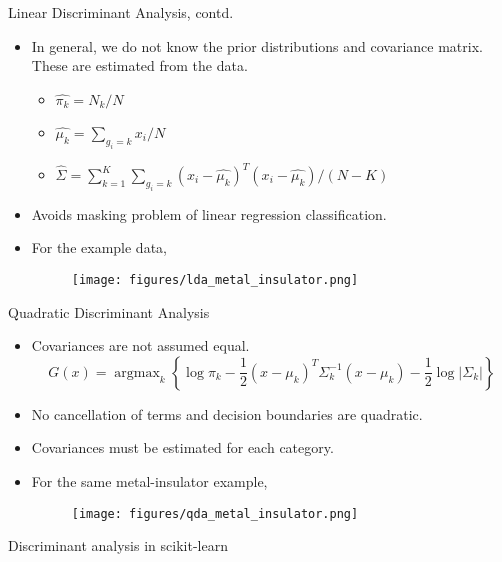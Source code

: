 \documentclass[aspectratio=169]{beamer}
\DeclareMathOperator*{\argmax}{argmax}
\begin{document}
\begin{frame}{Linear Discriminant Analysis, contd.}
    \begin{itemize}
        \item In general, we do not know the prior distributions and covariance matrix. These are estimated from the data.
        \begin{itemize}
            \item $\hat{\pi_k} = N_k/N$
            \item $\hat{\mu_k} = \sum_{g_i=k} x_i / N$
            \item $\hat{\Sigma} = \sum_{k=1}^K \sum_{g_i=k} (x_i - \hat{\mu_k})^T(x_i - \hat{\mu_k}) / (N - K)$
        \end{itemize}
        \item Avoids masking problem of linear regression classification.
        \item For the example data,
        \begin{figure}
            \centering
            \texttt{[image: figures/lda\_metal\_insulator.png]}
        \end{figure}
    \end{itemize}
\end{frame}


\begin{frame}{Quadratic Discriminant Analysis}
    \begin{itemize}
        \item Covariances are not assumed equal.
        \begin{equation*}
            G(x) = \argmax_k \left \{ \log{\pi_k} -\frac{1}{2}(x-\mu_k)^T\Sigma_k^{-1}(x-\mu_k) -\frac{1}{2} \log{|\Sigma_k|} \right \}
        \end{equation*}
        \item No cancellation of terms and decision boundaries are quadratic.
        \item Covariances must be estimated for each category.
        \item For the same metal-insulator example,
        \begin{figure}
            \centering
            \texttt{[image: figures/qda\_metal\_insulator.png]}
        \end{figure}
    \end{itemize}
\end{frame}


\begin{frame}[fragile]{Discriminant analysis in scikit-learn}
\inputminted{python}{example_sklearn_discriminant_analysis.py}
\end{frame} 
\end{document}
